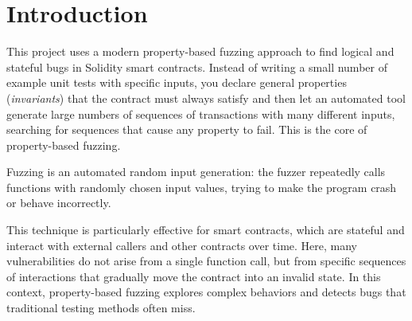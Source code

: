\section{Introduction}

This project uses a modern property-based fuzzing approach to find logical and stateful bugs in Solidity smart contracts. Instead of writing a small number of example unit tests with specific inputs, you declare general properties (\textit{invariants}) that the contract must always satisfy and then let an automated tool generate large numbers of sequences of transactions with many different inputs, searching for sequences that cause any property to fail. This is the core of property-based fuzzing.

Fuzzing is an automated random input generation: the fuzzer repeatedly calls functions with randomly chosen input values, trying to make the program crash or behave incorrectly.

This technique is particularly effective for smart contracts, which are stateful and interact with external callers and other contracts over time. Here, many vulnerabilities do not arise from a single function call, but from specific sequences of interactions that gradually move the contract into an invalid state. In this context, property-based fuzzing explores complex behaviors and detects bugs that traditional testing methods often miss.

